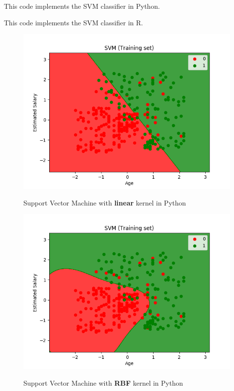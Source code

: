 \documentclass[runningheads,a4paper]{llncs}
\begin{document}
This code implements the SVM classifier in Python.
 


This code implements the SVM classifier in R.
 

\begin{figure}[H]
\centering
\begin{center}
\includegraphics[scale=0.8]{pics/svm_linear}
\label{uloha1:pic1}
\caption{Support Vector Machine with \textbf{linear} kernel in Python} 
\end{center}
\end{figure}

\begin{figure}[H]
\centering
\begin{center}
\includegraphics[scale=0.8]{pics/svm}
\label{uloha1:pic1}
\caption{Support Vector Machine with \textbf{RBF} kernel in Python} 
\end{center}
\end{figure}
\end{document}
